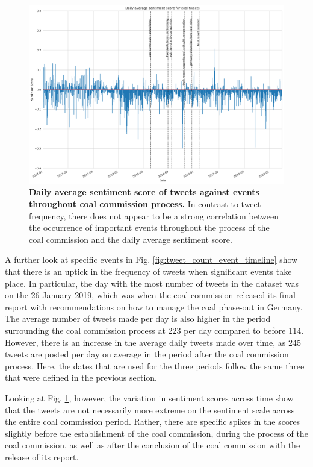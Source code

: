 \documentclass[12pt,onecolumn,twoside]{layout}
\begin{document}
\begin{figure}
	\begin{center}
		\includegraphics[width=\textwidth]{figures/sa_tweet_score_event_timeline3}
	\end{center}
	\caption{\textbf{Daily average sentiment score of tweets against events throughout coal commission process.} In contrast to tweet frequency, there does not appear to be a strong correlation between the occurrence of important events throughout the process of the coal commission and the daily average sentiment score.}
	\label{fig:tweet_score_event_timeline}
\end{figure}

A further look at specific events in Fig. \ref{fig:tweet_count_event_timeline} show that there is an uptick in the frequency of tweets when significant events take place. In particular, the day with the most number of tweets in the dataset was on the 26 January 2019, which was when the coal commission released its final report with recommendations on how to manage the coal phase-out in Germany. The average number of tweets made per day is also higher in the period surrounding the coal commission process at 223 per day compared to before 114. However, there is an increase in the average daily tweets made over time, as 245 tweets are posted per day on average in the period after the coal commission process. Here, the dates that are used for the three periods follow the same three that were defined in the previous section.

Looking at Fig. \ref{fig:tweet_score_event_timeline}, however, the variation in sentiment scores across time show that the tweets are not necessarily more extreme on the sentiment scale across the entire coal commission period. Rather, there are specific spikes in the scores slightly before the establishment of the coal commission, during the process of the coal commission, as well as after the conclusion of the coal commission with the release of its report.
\end{document}
